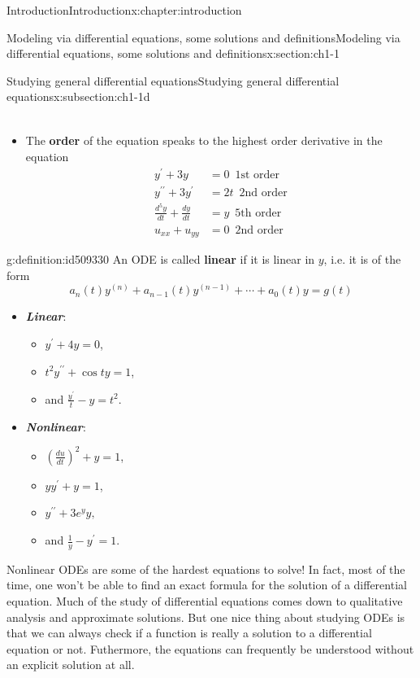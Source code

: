 \documentclass[oneside,10pt,]{book}
\newcommand{\alert}[1]{\textbf{\textit{#1}}}
\newcommand{\terminology}[1]{\textbf{#1}}
\numberwithin{equation}{section}
\numberwithin{equation}{section}
\newcommand{\amp}{&}
\begin{document}
\begin{chapterptx}{Introduction}{}{Introduction}{}{}{x:chapter:introduction}
\begin{sectionptx}{Modeling via differential equations, some solutions and definitions}{}{Modeling via differential equations, some solutions and definitions}{}{}{x:section:ch1-1}
\begin{subsectionptx}{Studying general differential equations}{}{Studying general differential equations}{}{}{x:subsection:ch1-1d}
\begin{itemize}[label=\textbullet]
\begin{align*}
\end{align*}
%
\item{}The \terminology{order} of the equation speaks to the highest order derivative in the equation%
\begin{align*}
y^{\prime}+3y \amp =0\,\,\,\text{1st order}\\
y^{\prime\prime}+3y^{\prime} \amp =2t\,\,\,\text{2nd order}\\
\frac{d^{5}y}{dt}+\frac{dy}{dt} \amp =y\,\,\,\text{5th order}\\
u_{xx}+u_{yy} \amp =0\,\,\,\text{2nd order}
\end{align*}
%
\end{itemize}
\begin{definition}{}{g:definition:id509330}%
An ODE is called \terminology{linear} if it is linear in \(y\), i.e. it is of the form%
\begin{equation*}
a_{n}(t)y^{(n)}+a_{n-1}(t)y^{(n-1)}+\cdots+a_{0}(t)y=g(t)
\end{equation*}
\end{definition}
%
\begin{itemize}[label=\textbullet]
\item{}\alert{Linear}:%
\begin{itemize}[label=$\circ$]
\item{}\(y^{\prime}+4y=0\),%
\item{}\(t^{2}y^{\prime\prime}+\cos ty=1\),%
\item{}and \(\frac{y^{\prime}}{t}-y=t^{2}\).%
\end{itemize}
%
\item{}\alert{Nonlinear}:%
\begin{itemize}[label=$\circ$]
\item{}\(\left(\frac{du}{dt}\right)^{2}+y=1\),%
\item{}\(yy^{\prime}+y=1\),%
\item{}\(\displaystyle y^{\prime\prime}+3e^{y}y,\)%
\item{}and \(\frac{1}{y}-y^{\prime}=1\).%
\end{itemize}
%
\end{itemize}
Nonlinear ODEs are some of the hardest equations to solve! In fact, most of the time, one won't be able to find an exact formula for the solution of a differential equation. Much of the study of differential equations comes down to qualitative analysis and approximate solutions. But one nice thing about studying ODEs is that we can always check if a function is really a solution to a differential equation or not. Futhermore, the equations can frequently be understood without an explicit solution at all.%

\end{subsectionptx}
\end{sectionptx}
\end{chapterptx}
\end{document}
